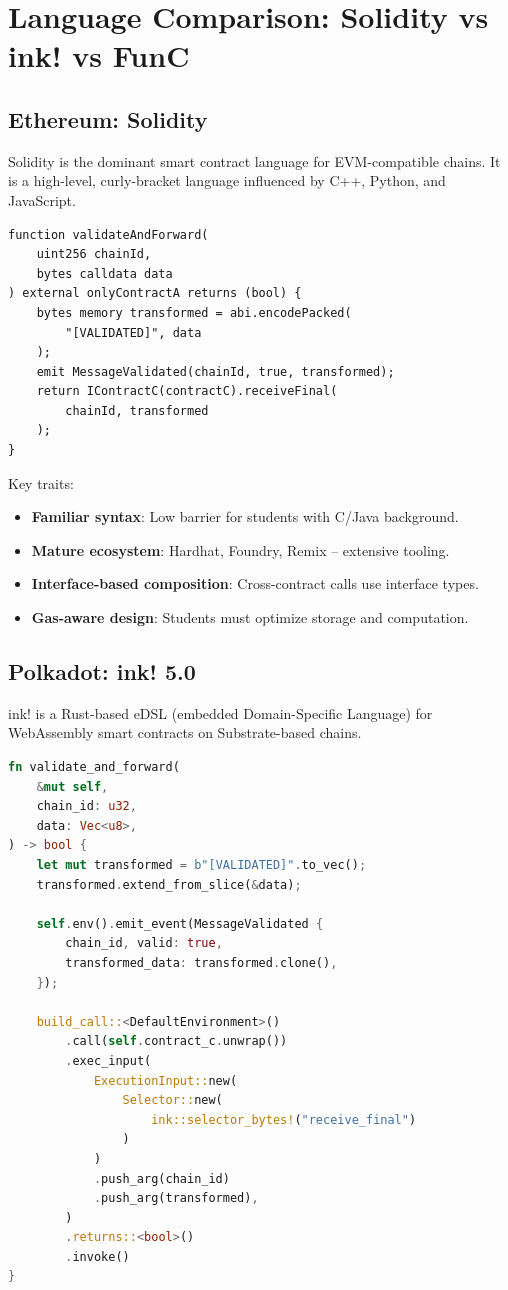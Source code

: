 \section{Language Comparison: Solidity vs ink! vs FunC}

\subsection{Ethereum: Solidity}

Solidity is the dominant smart contract language for EVM-compatible chains. It
is a high-level, curly-bracket language influenced by C++, Python, and
JavaScript.

\begin{lstlisting}[language=Solidity, caption=Chain forwarder in Solidity, label=lst:solidity]
function validateAndForward(
    uint256 chainId,
    bytes calldata data
) external onlyContractA returns (bool) {
    bytes memory transformed = abi.encodePacked(
        "[VALIDATED]", data
    );
    emit MessageValidated(chainId, true, transformed);
    return IContractC(contractC).receiveFinal(
        chainId, transformed
    );
}
\end{lstlisting}

Key traits:
\begin{itemize}
    \item \textbf{Familiar syntax}: Low barrier for students with C/Java background.
    \item \textbf{Mature ecosystem}: Hardhat, Foundry, Remix -- extensive tooling.
    \item \textbf{Interface-based composition}: Cross-contract calls use interface types.
    \item \textbf{Gas-aware design}: Students must optimize storage and computation.
\end{itemize}

\subsection{Polkadot: ink! 5.0}

ink! is a Rust-based eDSL (embedded Domain-Specific Language) for WebAssembly
smart contracts on Substrate-based chains.

\begin{lstlisting}[language=Rust, caption=Chain forwarder in ink! 5.0, label=lst:ink]
fn validate_and_forward(
    &mut self,
    chain_id: u32,
    data: Vec<u8>,
) -> bool {
    let mut transformed = b"[VALIDATED]".to_vec();
    transformed.extend_from_slice(&data);

    self.env().emit_event(MessageValidated {
        chain_id, valid: true,
        transformed_data: transformed.clone(),
    });

    build_call::<DefaultEnvironment>()
        .call(self.contract_c.unwrap())
        .exec_input(
            ExecutionInput::new(
                Selector::new(
                    ink::selector_bytes!("receive_final")
                )
            )
            .push_arg(chain_id)
            .push_arg(transformed),
        )
        .returns::<bool>()
        .invoke()
}
\end{lstlisting}

